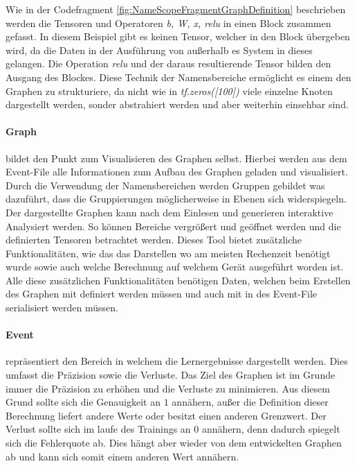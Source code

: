 \noindent
Wie in der Codefragment \ref{fig:NameScopeFragmentGraphDefinition} beschrieben werden die Tensoren und Operatoren \textit{b, W, x, relu} in einen Block zusammen gefasst. 
In diesem Beispiel gibt es keinen Tensor, welcher in den Block übergeben wird, da die Daten in der Ausführung von außerhalb es System in dieses gelangen. 
Die Operation \textit{relu} und der daraus resultierende Tensor bilden den Ausgang des Blockes. 
Diese Technik der Namensbereiche ermöglicht es einem den Graphen zu strukturiere, da nicht wie in \textit{tf.zeros([100])} viele einzelne Knoten dargestellt werden, sonder abstrahiert werden und aber weiterhin einsehbar sind.

\paragraph{Graph} bildet den Punkt zum Visualisieren des Graphen selbst. 
Hierbei werden aus dem Event-File alle Informationen zum Aufbau des Graphen geladen und visualisiert. 
Durch die Verwendung der Namensbereichen werden Gruppen gebildet was dazuführt, dass die Gruppierungen möglicherweise in Ebenen sich widerspiegeln. 
Der dargestellte Graphen kann nach dem Einlesen und generieren interaktive Analysiert werden. 
So können Bereiche vergrößert und geöffnet werden und die definierten Tensoren betrachtet werden. 
Dieses Tool bietet zusätzliche Funktionalitäten, wie das das Darstellen wo am meisten Rechenzeit benötigt wurde sowie auch welche Berechnung auf welchem Gerät ausgeführt worden ist. 
Alle diese zusätzlichen Funktionalitäten benötigen Daten, welchen beim Erstellen des Graphen mit definiert werden müssen und auch mit in des Event-File serialisiert werden müssen. 

\paragraph{Event} repräsentiert den Bereich in welchem die Lernergebnisse dargestellt werden. 
Dies umfasst die Präzision sowie die Verluste. 
Das Ziel des Graphen ist im Grunde immer die Präzision zu erhöhen und die Verluste zu minimieren. 
Aus diesem Grund sollte sich die Genauigkeit an $1$ annähern, außer die Definition dieser Berechnung liefert andere Werte oder besitzt einen anderen Grenzwert. 
Der Verlust sollte sich im laufe des Trainings an $0$ annähern, denn dadurch spiegelt sich die Fehlerquote ab. 
Dies hängt aber wieder von dem entwickelten Graphen ab und kann sich somit einem anderen Wert annähern.
\phantom \newline 

